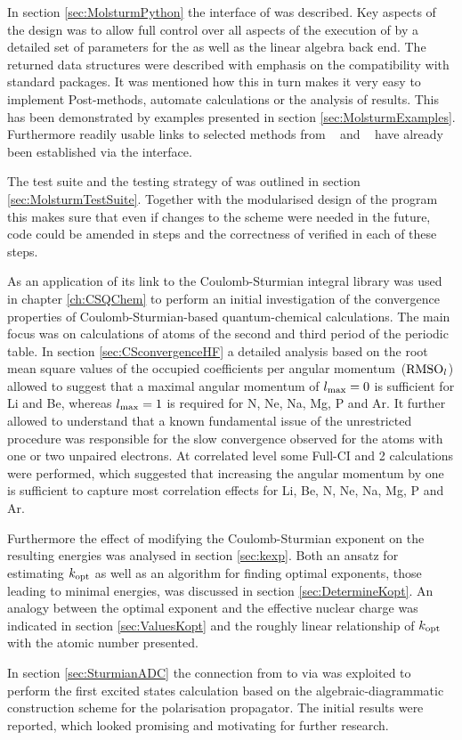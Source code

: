 In section \ref{sec:MolsturmPython}
the \python interface of \molsturm was described.
Key aspects of the design
was to allow full control over all aspects
of the execution of \molsturm by a detailed set of parameters
for the \SCF as well as the linear algebra back end.
The returned data structures were described
with emphasis on the compatibility
with standard \python packages.
It was mentioned how this in turn
makes it very easy to implement Post-\HF methods,
automate calculations or the analysis of results.
This has been demonstrated by examples
presented in section \ref{sec:MolsturmExamples}.
Furthermore
readily usable links to selected methods
from \pyscf~\cite{Sun2017} and \adcman~\cite{Wormit2014}
have already been established via the
\python interface.

The test suite and the testing strategy
of \molsturm was outlined in section \ref{sec:MolsturmTestSuite}.
Together with the modularised design of the program
this makes sure that even if changes to the \SCF scheme
were needed in the future,
code could be amended in steps
and the correctness of \molsturm verified in each of these steps.


As an application of \molsturm its link to the
Coulomb-Sturmian integral library \sturmint was used
in chapter \ref{ch:CSQChem} to perform an initial investigation
of the convergence properties of Coulomb-Sturmian-based
quantum-chemical calculations.
The main focus was on \HF calculations of atoms
of the second and third period of the periodic table.
In section \ref{sec:CSconvergenceHF}
a detailed analysis based on the root mean square values
of the occupied coefficients per angular momentum~($\text{RMSO}_l$)
allowed to suggest that
a maximal angular momentum of $l_\text{max} = 0$
is sufficient for Li and Be,
whereas $l_\text{max} = 1$ is required for N, Ne, Na, Mg, P and Ar.
It further allowed to understand that a known fundamental issue of
the unrestricted \HF procedure
was responsible for the slow convergence observed for the
atoms with one or two unpaired electrons.
At correlated level some Full-CI and {\MP}2 calculations
were performed,
which suggested that increasing the angular momentum
by one is sufficient to capture
most correlation effects for Li, Be, N, Ne, Na, Mg, P and Ar.

Furthermore the effect of modifying the Coulomb-Sturmian
exponent on the resulting \HF energies was analysed in section \ref{sec:kexp}.
Both an ansatz for estimating $k_\text{opt}$ as well as
an algorithm for finding optimal exponents,
\ie those leading to minimal energies,
was discussed in section \ref{sec:DetermineKopt}.
An analogy between the optimal exponent and
the effective nuclear charge was indicated in section \ref{sec:ValuesKopt}
and the roughly
linear relationship of $k_\text{opt}$ with the atomic number presented.

In section \ref{sec:SturmianADC} the connection from
\molsturm to \adcman via \python
was exploited to perform the first
excited states calculation based on the algebraic-diagrammatic construction
scheme for the polarisation propagator.
The initial results were reported,
which looked promising and motivating for further research.
